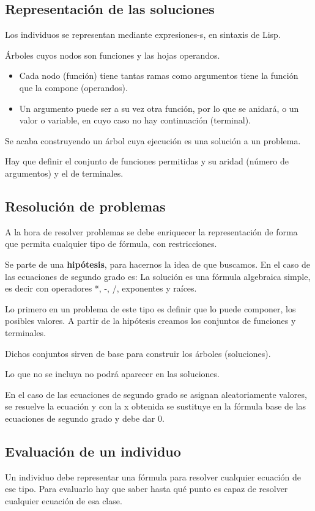 \documentclass[12pt, twoside, openright]{report} %
\begin{document}
\subsection{Representación de las soluciones}
Los individuos se representan mediante expresiones-s, en sintaxis de Lisp.

Árboles cuyos nodos son funciones y las hojas operandos.
\begin{itemize}
	\item Cada nodo (función) tiene tantas ramas como argumentos tiene la función que la compone (operandos).
	\item Un argumento puede ser a su vez otra función, por lo que se anidará, o un valor o variable, en cuyo caso no hay continuación (terminal).
\end{itemize}
Se acaba construyendo un árbol cuya ejecución es una solución a un problema.

Hay que definir el conjunto de funciones permitidas y su aridad (número de argumentos) y el de terminales.

\subsection{Resolución de problemas}
A la hora de resolver problemas se debe enriquecer la representación de forma que permita cualquier tipo de fórmula, con restricciones.

Se parte de una \textbf{hipótesis}, para hacernos la idea de que buscamos. En el caso de las ecuaciones de segundo grado es: La solución es una fórmula algebraica simple, es decir con operadores *, -, /, exponentes y raíces.

Lo primero en un problema de este tipo es definir que lo puede componer, los posibles valores. A partir de la hipótesis creamos los conjuntos de funciones y terminales. 

Dichos conjuntos sirven de base para construir los árboles (soluciones).

Lo que no se incluya no podrá aparecer en las soluciones.

En  el caso de las ecuaciones de segundo grado se asignan aleatoriamente valores, se resuelve la ecuación y con la x obtenida se sustituye en la fórmula base de las ecuaciones de segundo grado y debe dar 0.

\subsection{Evaluación de un individuo}
Un individuo debe representar una fórmula para resolver cualquier ecuación de ese tipo. Para evaluarlo hay que saber hasta qué punto es capaz de resolver cualquier ecuación de esa clase.
\end{document}
